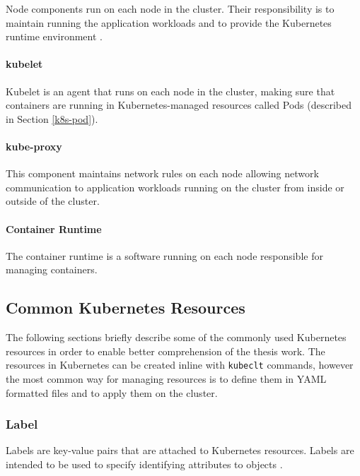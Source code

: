 Node components run on each node in the cluster. Their responsibility is to maintain running the application workloads and to provide the Kubernetes runtime environment \cite{KubernetesArchitecture}.

\paragraph{kubelet} Kubelet is an agent that runs on each node in the cluster, making sure that containers are running in Kubernetes-managed resources called Pods (described in Section \ref{k8s-pod}).

\paragraph{kube-proxy} This component maintains network rules on each node allowing network communication to application workloads running on the cluster from inside or outside of the cluster.

\paragraph{Container Runtime} The container runtime is a software running on each node responsible for managing containers.

\subsection{Common Kubernetes Resources}

The following sections briefly describe some of the commonly used Kubernetes resources in order to enable better comprehension of the thesis work. The resources in Kubernetes can be created inline with \texttt{kubeclt} commands, however the most common way for managing resources is to define them in YAML formatted files and to apply them on the cluster.

\subsubsection{Label}

Labels are key-value pairs that are attached to Kubernetes resources. Labels are intended to be used to specify identifying attributes to objects \cite{KubernetesLabel}.

